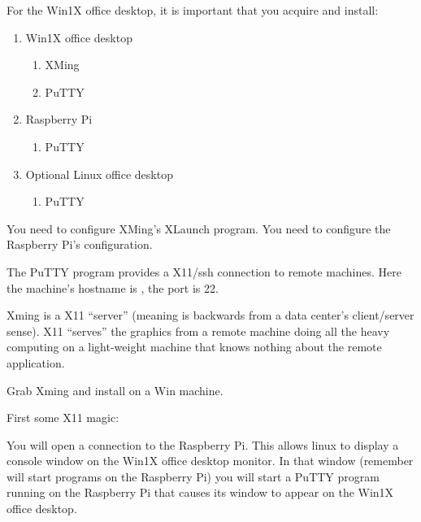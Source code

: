 For the Win1X office desktop, it is important that you acquire and install:
\vspace{-.15cm}
\begin{enumerate}\addtolength{\itemsep}{-0.5\baselineskip}
   \item   Win1X office desktop
\vspace{-.15cm}
\begin{enumerate}\addtolength{\itemsep}{-0.5\baselineskip}
   \item   XMing
   \item   PuTTY
\end{enumerate}
   \item   Raspberry Pi
\vspace{-.15cm}
\begin{enumerate}\addtolength{\itemsep}{-0.5\baselineskip}
   \item   PuTTY
\end{enumerate}
   \item   Optional Linux office desktop
\vspace{-.15cm}
\begin{enumerate}\addtolength{\itemsep}{-0.5\baselineskip}
   \item   PuTTY
\end{enumerate}
\end{enumerate}

You need to configure XMing's XLaunch program. You need to configure the
Raspberry Pi's configuration.


The PuTTY program provides a X11/ssh connection to remote machines. Here
the machine's hostname is , the port is 22.

Xming is a X11 ``server'' (meaning is backwards from a data center's
client/server sense). X11 ``serves'' the graphics from a remote machine
doing all the heavy computing on a light-weight machine that knows nothing
about the remote application.

Grab Xming and install on a Win machine.

First some X11 magic:

You will open a  connection to the Raspberry Pi. This
allows linux to display a console window on the Win1X office desktop
monitor. In that window (remember will start programs on the Raspberry
Pi) you will start a PuTTY program running on the Raspberry Pi that
causes its window to appear on the Win1X office desktop.

